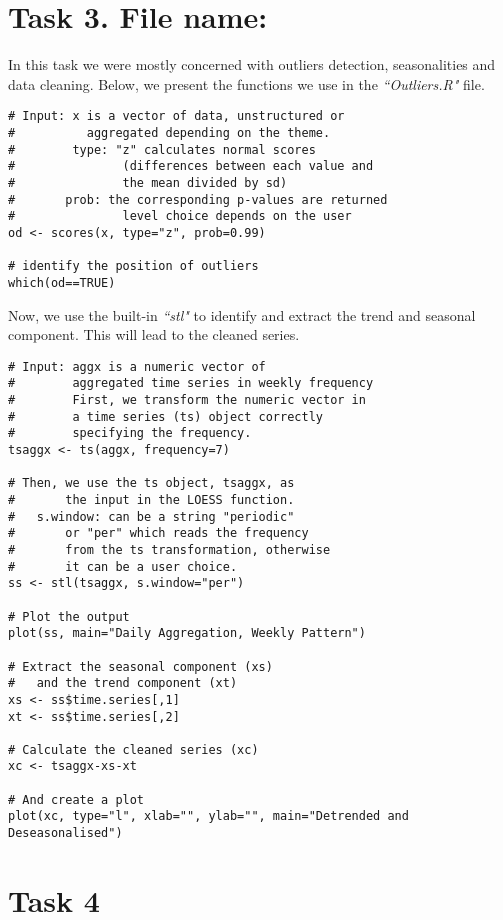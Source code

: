 \documentclass[12pt]{article}
\begin{document}
\section{Task 3. File name: \color{blue}{Outliers.R}}

In this task we were mostly concerned with outliers detection, seasonalities
and data cleaning. Below, we present the functions we use in the \emph{%
``Outliers.R"} file.

\begin{lstlisting}[title=\textbf{Using \emph{scores()} from the \emph{``outliers"} package.}]
# Input: x is a vector of data, unstructured or
#          aggregated depending on the theme.
#        type: "z" calculates normal scores
#               (differences between each value and
#               the mean divided by sd)
#       prob: the corresponding p-values are returned
#               level choice depends on the user
od <- scores(x, type="z", prob=0.99)

# identify the position of outliers
which(od==TRUE)
\end{lstlisting}

Now, we use the built-in \emph{``stl"} to identify and extract the trend and
seasonal component. This will lead to the cleaned series.
\begin{lstlisting}[title=\textbf{Seasonal Decomposition of Time Series by Loess.}]
# Input: aggx is a numeric vector of
#        aggregated time series in weekly frequency
# 		 First, we transform the numeric vector in
#        a time series (ts) object correctly
#        specifying the frequency.
tsaggx <- ts(aggx, frequency=7)

# Then, we use the ts object, tsaggx, as
#       the input in the LOESS function.
# 	s.window: can be a string "periodic"
#       or "per" which reads the frequency
#       from the ts transformation, otherwise
#       it can be a user choice.
ss <- stl(tsaggx, s.window="per")

# Plot the output
plot(ss, main="Daily Aggregation, Weekly Pattern")

# Extract the seasonal component (xs)
#   and the trend component (xt)
xs <- ss$time.series[,1]
xt <- ss$time.series[,2]

# Calculate the cleaned series (xc)
xc <- tsaggx-xs-xt

# And create a plot
plot(xc, type="l", xlab="", ylab="", main="Detrended and Deseasonalised")
\end{lstlisting}

\section{Task 4}
\end{document}
